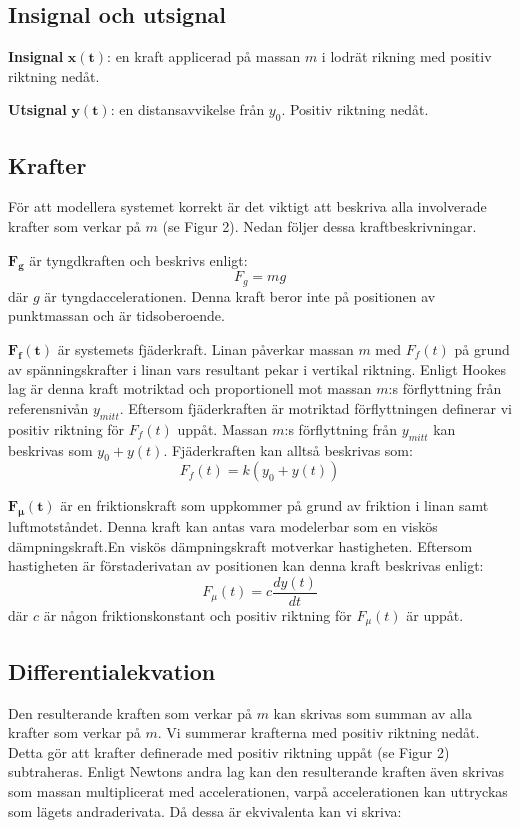 \subsection{Insignal och utsignal}
\textbf{Insignal} $\bm{x(t)}$:
en kraft applicerad på massan $m$ i lodrät rikning med positiv riktning nedåt.

\textbf{Utsignal} $\bm{y(t)}$:
en distansavvikelse från $y_0$. Positiv riktning nedåt.

\subsection{Krafter}
För att modellera systemet korrekt är det viktigt att beskriva alla involverade krafter som verkar på $m$ (se Figur 2). Nedan följer dessa kraftbeskrivningar.

$\bm{F_g}$ är tyngdkraften och beskrivs enligt: 
$$F_g=mg$$
där $g$ är tyngdaccelerationen. Denna kraft beror inte på positionen av punktmassan och är tidsoberoende.

$\bm{F_f(t)}$ är systemets fjäderkraft. Linan påverkar massan $m$ med $F_f(t)$ på grund av spänningskrafter i linan vars resultant pekar i vertikal riktning. Enligt Hookes lag är denna kraft motriktad och proportionell mot massan $m$:s förflyttning från referensnivån $y_{mitt}$. Eftersom fjäderkraften är motriktad förflyttningen definerar vi positiv riktning för $F_f(t)$ uppåt. Massan $m$:s förflyttning från $y_{mitt}$ kan beskrivas som $y_0+y(t)$. Fjäderkraften kan alltså beskrivas som: $$F_f(t) = k(y_0+y(t))$$

$\bm{F_\mu(t)}$ är en friktionskraft som uppkommer på grund av friktion i linan samt luftmotståndet. Denna kraft kan antas vara modelerbar som en viskös dämpningskraft.En viskös dämpningskraft motverkar hastigheten. Eftersom hastigheten är förstaderivatan av positionen kan denna kraft beskrivas enligt: 
$$F_\mu(t) = c\frac{dy(t)}{dt}$$
där $c$ är någon friktionskonstant och positiv riktning för $F_\mu(t)$ är uppåt.

\subsection{Differentialekvation}
Den resulterande kraften som verkar på $m$ kan skrivas som summan av alla krafter som verkar på $m$. Vi summerar krafterna med positiv riktning nedåt. Detta gör att krafter definerade med positiv riktning uppåt (se Figur 2) subtraheras. Enligt Newtons andra lag kan den resulterande kraften även skrivas som massan multiplicerat med accelerationen, varpå accelerationen kan uttryckas som lägets andraderivata. Då dessa är ekvivalenta kan vi skriva:

